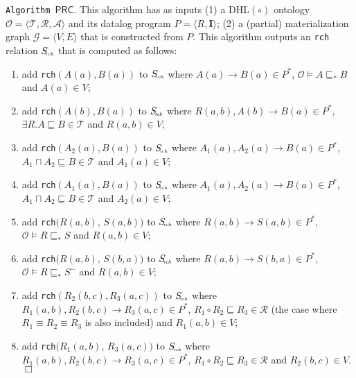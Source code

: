 \noindent\texttt{Algorithm~$\mathsf{PRC}$}. This algorithm has as inputs (1)
a DHL$(\circ)$ ontology $\mathcal{O}=\langle\mathcal{T},\mathcal{R},\mathcal{A}\rangle$
and its datalog program $P=\langle R, \textbf{I}\rangle$;
(2) a (partial) materialization graph $\mathcal{G}=\langle V,E\rangle$ that is constructed from $P$.
This algorithm outputs an \texttt{rch} relation $S_{\!\textit{\tiny rch}}$ that
is computed as follows:

\begin{enumerate}[leftmargin=4ex,label=$\bullet$]
\item add \texttt{rch}$(A(a),B(a))$ to $S_{\textit{\!\tiny rch}}$
  where $A(a)\rightarrow B(a)\in P^*$, $\mathcal{O}\models
  A\sqsubseteq_* B$  and $A(a)\in V$;

\item add \texttt{rch}$(A(b),B(a))$ to $S_{\textit{\!\tiny rch}}$ where $R(a,b),A(b)\rightarrow B(a)\in P^*$, $\exists R.A\sqsubseteq B\in\mathcal{T}$ and $R(a,b)\in V$;

\item add \texttt{rch}$(A_2(a),B(a))$ to $S_{\textit{\!\tiny rch}}$ where $A_1(a),A_2(a)\rightarrow B(a)\in P^*$,
    $A_1\sqcap A_2\sqsubseteq B\in\mathcal{T}$ and $A_1(a)\in V$;

\item add \texttt{rch}$(A_1(a),B(a))$ to $S_{\textit{\!\tiny rch}}$ where $A_1(a),A_2(a)\rightarrow B(a)\in P^*$,
    $A_1\sqcap A_2\sqsubseteq B\in\mathcal{T}$ and $A_2(a)\in V$;

\item add \texttt{rch}$(R(a,b)$, $S(a,b))$ to $S_{\textit{\!\tiny rch}}$ where $R(a,b)\rightarrow S(a,b)\in P^*$,
    $\mathcal{O}\models R\sqsubseteq_* S$ and $R(a,b)\in V$;

\item add \texttt{rch}$(R(a,b)$, $S(b,a))$ to $S_{\textit{\!\tiny rch}}$ where $R(a,b)\rightarrow S(b,a)\in P^*$,
    $\mathcal{O}\models R\sqsubseteq_* S^-$ and $R(a,b)\in V$;

\item add \texttt{rch}$(R_2(b,c),R_3(a,c))$ to $S_{\textit{\!\tiny rch}}$ where $R_1(a,b),R_2(b,c)\rightarrow R_3(a,c)\in P^*$,
    $R_1\circ R_2\sqsubseteq R_3\in\mathcal{R}$ (the case
    where $R_1\equiv R_2\equiv R_3$ is also included) and $R_1(a,b)\in V$;

\item add \texttt{rch}$(R_1(a,b)$, $R_3(a,c))$ to $S_{\textit{\!\tiny rch}}$ where $R_1(a,b),R_2(b,c)\rightarrow R_3(a,c)\in P^*$,
    $R_1\circ R_2\sqsubseteq R_3\in\mathcal{R}$ and $R_2(b,c)\in V$.\hfill$\Box$
\end{enumerate}

